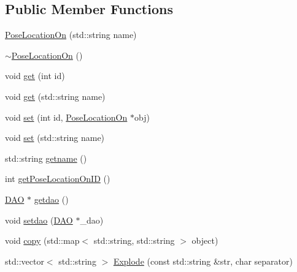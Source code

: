 \subsection*{Public Member Functions}
\begin{DoxyCompactItemize}
\item 
\hyperlink{class_pose_location_on_a8904bd0b8c589a9253c70d7b8fd5c37d}{PoseLocationOn} (std::string name)
\item 
\hyperlink{class_pose_location_on_a49374a6c16adbd34de703286b924b5c3}{$\sim$PoseLocationOn} ()
\item 
void \hyperlink{class_pose_location_on_a77df4e49b397b0f4396c27ac95a16734}{get} (int id)
\item 
void \hyperlink{class_pose_location_on_a492a9e2663a3613a8d408a73bd5e1db2}{get} (std::string name)
\item 
void \hyperlink{class_pose_location_on_ace3e449c5d8cd8e254cd66d6d4d50fa3}{set} (int id, \hyperlink{class_pose_location_on}{PoseLocationOn} $\ast$obj)
\item 
void \hyperlink{class_pose_location_on_a2c3e33342ab68431d3657cf8a34d9347}{set} (std::string name)
\item 
std::string \hyperlink{class_pose_location_on_ab2ee4698cae78d63ab67919bd2a2f17e}{getname} ()
\item 
int \hyperlink{class_pose_location_on_a9de5c6d7fc48f8316101ed9d3c2fde02}{getPoseLocationOnID} ()
\item 
\hyperlink{class_d_a_o}{DAO} $\ast$ \hyperlink{class_pose_location_on_af2f51f0dbb23646d082f5c2237dac3a1}{getdao} ()
\item 
void \hyperlink{class_pose_location_on_a9948176529b12221d938e1e5b1828149}{setdao} (\hyperlink{class_d_a_o}{DAO} $\ast$\_\-dao)
\item 
void \hyperlink{class_pose_location_on_a48014388aa8ab0cf554c5b119ed6cd64}{copy} (std::map$<$ std::string, std::string $>$ object)
\item 
std::vector$<$ std::string $>$ \hyperlink{class_pose_location_on_ab1be6bd172124568f01f1275e8b3715e}{Explode} (const std::string \&str, char separator)
\end{DoxyCompactItemize}


